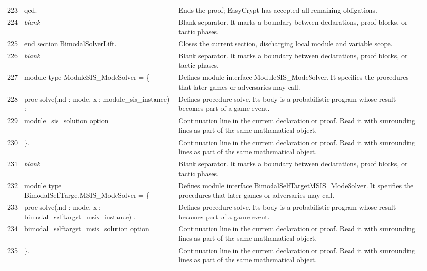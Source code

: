 \documentclass[10pt]{article}
\begin{document}
\begin{longtable}{r L{0.53\textwidth} L{0.37\textwidth}}
223 & {\ttfamily\scriptsize qed.} & Ends the proof; EasyCrypt has accepted all remaining obligations. \\
224 & {\ttfamily\scriptsize \emph{blank}} & Blank separator.  It marks a boundary between declarations, proof blocks, or tactic phases. \\
225 & {\ttfamily\scriptsize end section BimodalSolverLift.} & Closes the current section, discharging local module and variable scope. \\
226 & {\ttfamily\scriptsize \emph{blank}} & Blank separator.  It marks a boundary between declarations, proof blocks, or tactic phases. \\
227 & {\ttfamily\scriptsize module type ModuleSIS\_ModeSolver = \{} & Defines module interface ModuleSIS\_ModeSolver.  It specifies the procedures that later games or adversaries may call. \\
228 & {\ttfamily\scriptsize   proc solve(md : mode, x : module\_sis\_instance) :} & Defines procedure solve.  Its body is a probabilistic program whose result becomes part of a game event. \\
229 & {\ttfamily\scriptsize     module\_sis\_solution option} & Continuation line in the current declaration or proof.  Read it with surrounding lines as part of the same mathematical object. \\
230 & {\ttfamily\scriptsize \}.} & Continuation line in the current declaration or proof.  Read it with surrounding lines as part of the same mathematical object. \\
231 & {\ttfamily\scriptsize \emph{blank}} & Blank separator.  It marks a boundary between declarations, proof blocks, or tactic phases. \\
232 & {\ttfamily\scriptsize module type BimodalSelfTargetMSIS\_ModeSolver = \{} & Defines module interface BimodalSelfTargetMSIS\_ModeSolver.  It specifies the procedures that later games or adversaries may call. \\
233 & {\ttfamily\scriptsize   proc solve(md : mode, x : bimodal\_selftarget\_msis\_instance) :} & Defines procedure solve.  Its body is a probabilistic program whose result becomes part of a game event. \\
234 & {\ttfamily\scriptsize     bimodal\_selftarget\_msis\_solution option} & Continuation line in the current declaration or proof.  Read it with surrounding lines as part of the same mathematical object. \\
235 & {\ttfamily\scriptsize \}.} & Continuation line in the current declaration or proof.  Read it with surrounding lines as part of the same mathematical object. \\

\end{longtable}
\end{document}
